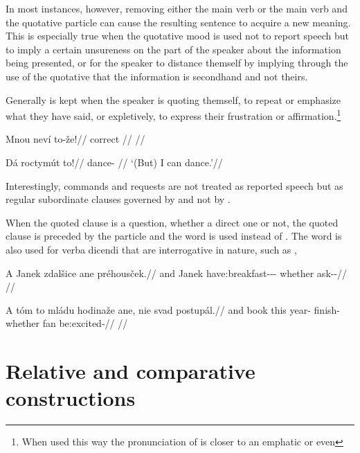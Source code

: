 In most instances, however, removing either the main verb or the main verb and the quotative particle can cause the resulting sentence to acquire a new meaning. This is especially true when the quotative mood is used not to report speech but to imply a certain unsureness on the part of the speaker about the information being presented, or for the speaker to distance themself by implying through the use of the quotative that the information is secondhand and not theirs.

Generally  is kept when the speaker is quoting themself, to repeat or emphasize what they have said, or expletively, to express their frustration or affirmation.\footnote{When used this way the pronunciation of  is closer to an emphatic  or even }


\pex
\begingl
\gla Mnou neví to-že!//
\glb correct  //
\glft {}//
\endgl
\xe

\pex
\begingl
\gla Dá roctymút to!//
\glb \First{}\Sg{} dance- //
\glft `(But) I can dance.'//
\endgl
\xe


Interestingly, commands and requests are not treated as reported speech but as regular subordinate clauses governed by  and not by .

When the quoted clause is a question, whether a direct one or not, the quoted clause is preceded by the particle  and the word  is used instead of . The word  is also used for verba dicendi that are interrogative in nature, such as ,

\pex
\begingl
  \gla A Janek zdalšice ane préhousček.//
  \glb and Janek have:breakfast-\Av{}-\Pf{}-\Quot{} whether ask-\Av{}-\Pf{}//
  \glft {}//
\endgl
\xe

\pex
\begingl
  \gla A tóm to mládu hodinaže ane, nie svad postupál.//
  \glb and book this year-\Ins{} finish- whether \Pl{} fan be:excited-//
  \glft {}//
\endgl
\xe



\section{Relative and comparative constructions}\label{relativecomparative}


